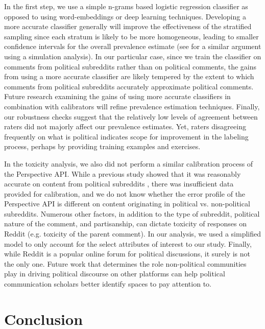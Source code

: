 \documentclass[letterpaper]{article} %
\begin{document}
In the first step, we use a simple n-grams based logistic regression classifier as opposed to using word-embeddings or deep learning techniques. Developing a more accurate classifier generally will improve the effectiveness of the stratified sampling since each stratum is likely to be more homogeneous, leading to smaller confidence intervals for the overall prevalence estimate (see \cite{kumar2018classifier} for a similar argument using a simulation analysis). In our particular case, since we train the classifier on comments from political subreddits rather than on political comments, the gains from using a more accurate classifier are likely tempered by the extent to which comments from political subreddits accurately approximate political comments. Future research examining the gains of using more accurate classifiers in combination with calibrators will refine prevalence estimation techniques. Finally, our robustness checks suggest that the relatively low levels of agreement between raters did not majorly affect our prevalence estimates. Yet, raters disagreeing frequently on what is political indicates scope for improvement in the labeling process, perhaps by providing training examples and exercises.



In the toxicity analysis, we also did not perform a similar calibration process of the Perspective API. While a previous study showed that it was reasonably accurate on content from political subreddits \cite{rajadesingan2020quick}, there was insufficient data provided for calibration, and we do not know whether the error profile of the Perspective API is different on content originating in political vs. non-political subreddits. Numerous other factors, in addition to the type of subreddit, political nature of the comment, and partisanship, can dictate toxicity of responses on Reddit (e.g. toxicity of the parent comment). In our analysis, we used a simplified model to only account for the select attributes of interest to our study.
Finally, while Reddit is a popular online forum for political discussions, it surely is not the only one. Future work that determines the role non-political communities play in driving political discourse on other platforms can help political communication scholars better identify spaces to pay attention to.


\section{Conclusion}
\end{document}
